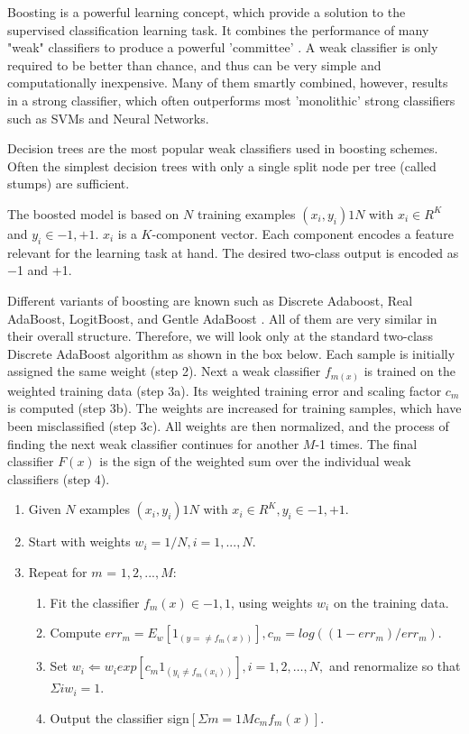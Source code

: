 Boosting is a powerful learning concept, which provide a solution to the supervised classification learning task. It combines the performance of many "weak" classifiers to produce a powerful 'committee' . A weak classifier is only required to be better than chance, and thus can be very simple and computationally inexpensive. Many of them smartly combined, however, results in a strong classifier, which often outperforms most 'monolithic' strong classifiers such as SVMs and Neural Networks.

Decision trees are the most popular weak classifiers used in boosting schemes. Often the simplest decision trees with only a single split node per tree (called stumps) are sufficient.

The boosted model is based on $N$ training examples ${(x_i,y_i)}1N$ with $x_i \in{R^K}$ and $y_i \in{-1, +1}$. $x_i$ is a $K$-component vector. Each component encodes a feature relevant for the learning task at hand. The desired two-class output is encoded as −1 and +1.

Different variants of boosting are known such as Discrete Adaboost, Real AdaBoost, LogitBoost, and Gentle AdaBoost . All of them are very similar in their overall structure. Therefore, we will look only at the standard two-class Discrete AdaBoost algorithm as shown in the box below. Each sample is initially assigned the same weight (step 2). Next a weak classifier $f_{m(x)}$ is trained on the weighted training data (step 3a). Its weighted training error and scaling factor $c_m$ is computed (step 3b). The weights are increased for training samples, which have been misclassified (step 3c). All weights are then normalized, and the process of finding the next weak classifier continues for another $M$-1 times. The final classifier $F(x)$ is the sign of the weighted sum over the individual weak classifiers (step 4).
\begin{enumerate}
\item{Given $N$ examples ${(x_i,y_i)}1N$ with $x_i \in{R^K}, y_i \in{-1, +1}$.}
\item{Start with weights $w_i = 1/N, i = 1,...,N$.}
\item{Repeat for $m$ = $1,2,...,M$:
\begin{enumerate}
\item{Fit the classifier $f_m(x) \in{-1,1}$, using weights $w_i$ on the training data.}
\item{Compute $err_m = E_w [1_{(y =\neq f_m(x))}], c_m = log((1 - err_m)/err_m)$.}
\item{Set $w_i \Leftarrow w_i exp[c_m 1_{(y_i \neq f_m(x_i))}], i = 1,2,…,N,$ and renormalize so that $\Sigma i w_i = 1$.}
\item{Output the classifier sign$[\Sigma m = 1M c_m f_m(x)]$.}
\end{enumerate}}
\end{enumerate}

